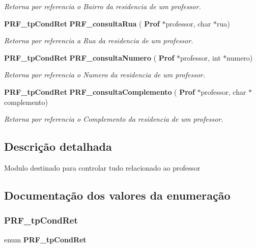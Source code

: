 \begin{DoxyCompactItemize}
\begin{DoxyCompactList}\small\item\em Retorna por referencia o Bairro da residencia de um professor. \end{DoxyCompactList}\item 
\textbf{ P\+R\+F\+\_\+tp\+Cond\+Ret} \textbf{ P\+R\+F\+\_\+consulta\+Rua} (\textbf{ Prof} $\ast$professor, char $\ast$rua)
\begin{DoxyCompactList}\small\item\em Retorna por referencia a Rua da residencia de um professor. \end{DoxyCompactList}\item 
\textbf{ P\+R\+F\+\_\+tp\+Cond\+Ret} \textbf{ P\+R\+F\+\_\+consulta\+Numero} (\textbf{ Prof} $\ast$professor, int $\ast$numero)
\begin{DoxyCompactList}\small\item\em Retorna por referencia o Numero da residencia de um professor. \end{DoxyCompactList}\item 
\textbf{ P\+R\+F\+\_\+tp\+Cond\+Ret} \textbf{ P\+R\+F\+\_\+consulta\+Complemento} (\textbf{ Prof} $\ast$professor, char $\ast$complemento)
\begin{DoxyCompactList}\small\item\em Retorna por referencia o Complemento da residencia de um professor. \end{DoxyCompactList}\end{DoxyCompactItemize}


\subsection{Descrição detalhada}
Modulo destinado para controlar tudo relacionado ao professor 

\subsection{Documentação dos valores da enumeração}
\mbox{\label{group__modulo_professor_ga777e215896d573d2e99d98793b1f0ed1}} 
\subsubsection{P\+R\+F\+\_\+tp\+Cond\+Ret}
{\footnotesize\ttfamily enum \textbf{ P\+R\+F\+\_\+tp\+Cond\+Ret}}



